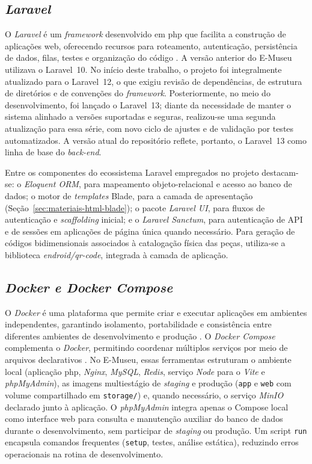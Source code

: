 \subsection{\textit{Laravel}}

O \textit{Laravel} é um \textit{framework} desenvolvido em \acrshort{php} que facilita a construção de aplicações web, oferecendo recursos para roteamento, autenticação, persistência de dados, filas, testes e organização do código \cite{laravel}. A versão anterior do E-Museu utilizava o Laravel~10. No início deste trabalho, o projeto foi integralmente atualizado para o Laravel~12, o que exigiu revisão de dependências, de estrutura de diretórios e de convenções do \textit{framework}. Posteriormente, no meio do desenvolvimento, foi lançado o Laravel~13; diante da necessidade de manter o sistema alinhado a versões suportadas e seguras, realizou-se uma segunda atualização para essa série, com novo ciclo de ajustes e de validação por testes automatizados. A versão atual do repositório reflete, portanto, o Laravel~13 como linha de base do \textit{back-end}.

Entre os componentes do ecossistema Laravel empregados no projeto destacam-se: o \textit{Eloquent ORM}, para mapeamento objeto-relacional e acesso ao banco de dados; o motor de \textit{templates} Blade, para a camada de apresentação (Seção~\ref{sec:materiais-html-blade}); o pacote \textit{Laravel UI}, para fluxos de autenticação e \textit{scaffolding} inicial; e o \textit{Laravel Sanctum}, para autenticação de API e de sessões em aplicações de página única quando necessário. Para geração de códigos bidimensionais associados à catalogação física das peças, utiliza-se a biblioteca \textit{endroid/qr-code}, integrada à camada de aplicação.


\subsection{\textit{Docker e Docker Compose}}\label{sec:materiais-docker}

O \textit{Docker} é uma plataforma que permite criar e executar aplicações em ambientes independentes, garantindo isolamento, portabilidade e consistência entre diferentes ambientes de desenvolvimento e produção \cite{docker}. O \textit{Docker Compose} complementa o \textit{Docker}, permitindo coordenar múltiplos serviços por meio de arquivos declarativos \cite{docker,dockercompose}. No E-Museu, essas ferramentas estruturam o ambiente local (aplicação \acrshort{php}, \textit{Nginx}, \textit{MySQL}, \textit{Redis}, serviço \textit{Node} para o \textit{Vite} e \textit{phpMyAdmin}), as imagens multiestágio de \textit{staging} e produção (\texttt{app} e \texttt{web} com volume compartilhado em \texttt{storage/}) e, quando necessário, o serviço \textit{MinIO} declarado junto à aplicação. O \textit{phpMyAdmin} \cite{phpmyadmin} integra apenas o Compose local como interface web para consulta e manutenção auxiliar do banco de dados durante o desenvolvimento, sem participar de \textit{staging} ou produção. Um script \texttt{run} encapsula comandos frequentes (\texttt{setup}, testes, análise estática), reduzindo erros operacionais na rotina de desenvolvimento.


